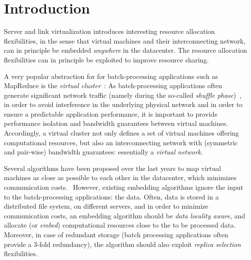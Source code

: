 \documentclass[9pt]{sigcomm-alternate}
\begin{document}
\section{Introduction}


Server and link virtualization introduces interesting resource allocation flexibilities,
in the sense that virtual machines and their interconnecting network,
can in principle be embedded \emph{anywhere} in the datacenter.
The resource allocation flexibilities
can in principle be exploited to improve resource sharing.

A very popular abstraction for for batch-processing applications such as MapReduce is the \emph{virtual cluster}~\cite{oktopus}:
As batch-processing applications often generate significant
network traffic (namely during the so-called \emph{shuffle phase})~\cite{amazonbw},
in order to avoid interference in the underlying physical network and in order to ensure a predictable
application performance,
it is important to provide performance isolation and bandwidth guarantees between virtual machines.~\cite{talk-about}
Accordingly, a virtual cluster not only defines a set of virtual machines offering computational resources,
but also an interconnecting network with (symmetric and pair-wise) bandwidth guarantees: essentially a \emph{virtual network}.

Several algorithms have been proposed over the last years to map virtual machines as close as possible
to each other in the datacenter, which minimizes communication costs.~\cite{oktopus,proteus}
However, existing embedding algorithms ignore the input to the batch-processing applications:
the data. Often, data is stored in a distributed file system, on different servers,
and in order to minimize
communication costs, an embedding algorithm should be \emph{data locality aware},
and allocate (or \emph{embed}) computational resources close to the to be processed data. Moreover, in case of redundant storage (batch processing
applications often provide a 3-fold redundancy), the algorithm should also exploit \emph{replica selection}
flexibilities.
\end{document}
